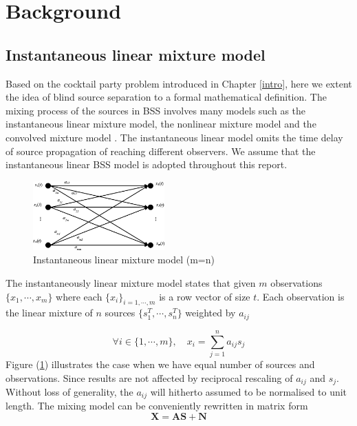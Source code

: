 \section{Background} \label{background}
\subsection{Instantaneous linear mixture model} \label{bssmodel}
Based on the cocktail party problem introduced in Chapter \ref{intro}, here we extent the idea of blind source separation to a formal mathematical definition. %
The mixing process of the sources in BSS involves many models such as the instantaneous linear mixture model, the nonlinear mixture model and the convolved mixture model \cite{Hxu2014}. The instantaneous linear model omits the time delay of source propagation of reaching different observers. We assume that the instantaneous linear BSS model is adopted throughout this report.\\

\begin{figure}[H]
\centering
\includegraphics[width=0.45\textwidth]{images/Instantaneous-linear-mixture-model.png}
\caption{Instantaneous linear mixture model (m=n)}
\label{Ins_LMM}
\end{figure}


The instantaneously linear mixture model states that given $m$ observations $\{x_1,\cdots, x_m\}$ where each $\{x_i\}_{i=1, \cdots,m}$ is a row vector of size $t$. Each observation is the linear mixture of $n$ sources $\{s_1^T,\cdots, s_n^T\}$ weighted by $a_{ij}$

\begin{equation}
    \forall i \in \{1, \cdots, m\}, \quad x_i = \sum_{j=1}^n a_{ij}s_j
    \label{sumofs_t}
\end{equation}
Figure (\ref{Ins_LMM}) illustrates the case when we have equal number of sources and observations. Since results are not affected by reciprocal rescaling of $a_{ij}$ and $s_j$. Without loss of generality, the $a_{ij}$ will hitherto assumed to be normalised to unit length. The mixing model can be conveniently rewritten in matrix form
\begin{equation}
    \mathbf{X} = \mathbf{AS} +\mathbf{N}   
    \label{mixing}
\end{equation}

